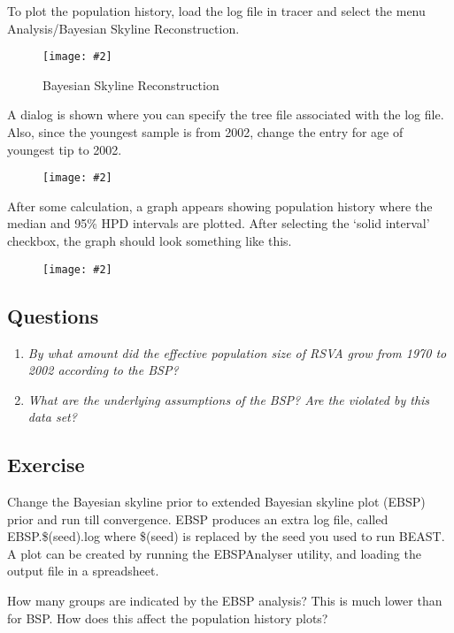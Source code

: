 \documentclass[12pt]{article}
\newcommand{\includeimage}[2][]{%
\texttt{[image: \#2]}
}
\begin{document}
To plot the population history, load the log file in tracer and select the menu 
Analysis/Bayesian Skyline Reconstruction.

\begin{figure}
\centering	
\includeimage[scale=0.3,clip=true,trim=0 300 0 0]{figures/tracerBSP1}
\label{fig:tracerBSP1}
\caption{Bayesian Skyline Reconstruction}
\end{figure}

A dialog is shown where you can specify the tree file associated with the log file.
Also, since the youngest sample is from 2002, change the entry for age of youngest
tip to 2002.

\begin{figure}
\centering	
\includeimage[width=0.5\textwidth]{figures/tracerBSP2}
\label{fig:tracerBSP2}
\end{figure}

After some calculation, a graph appears showing population history where the median
and 95\% HPD intervals are plotted. After selecting the `solid interval' checkbox, the
graph should look something like this.

\begin{figure}[h]
\centering	
\includeimage[width=0.5\textwidth]{figures/tracerBSP3}
\label{fig:tracerBSP3}
\end{figure}


\subsection*{Questions}
\begin{enumerate}
\item \textit{By what amount did the effective population size of RSVA grow from 1970 to 2002 according to the BSP?}
 

\item \textit{What are the underlying assumptions of the BSP? Are the violated by this data set?}
 
\end{enumerate}


\subsection{Exercise}
Change the Bayesian skyline prior to extended Bayesian skyline plot (EBSP) prior and run
till convergence. EBSP produces an extra log file, called EBSP.\$(seed).log where \$(seed)
is replaced by the seed you used to run BEAST.
A plot can be created by running the EBSPAnalyser utility, and loading the output file
in a spreadsheet.

How many groups are indicated by the EBSP analysis?
This is much lower than for BSP. How does this affect the population history plots?

 

\end{document}
